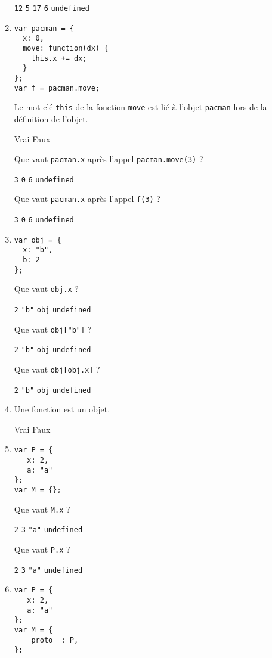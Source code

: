 \documentclass[a4paper, 12pt]{article}
\newcommand{\choice}[1]{\Square\hspace{2pt} #1\hspace{5pt}}
\newcommand{\choicec}[1]{\Square\hspace{2pt} \lstinline{#1}\hspace{5pt}}
\begin{document}
\begin{enumerate}
  \choicec{12} \choicec{5} \choicec{17} \choicec{6} \choicec{undefined}
\item \lstset{language=javascript}
\begin{lstlisting}
var pacman = {
  x: 0,
  move: function(dx) {
    this.x += dx;
  }
};
var f = pacman.move;
\end{lstlisting}

  Le mot-clé \lstinline{this} de la fonction \lstinline{move} est lié
  à l'objet \lstinline{pacman} lors de la définition de l'objet.

  \choice{Vrai} \choice{Faux}

  Que vaut \lstinline{pacman.x} après l'appel
  \lstinline{pacman.move(3)} ?

  \choicec{3} \choicec{0} \choicec{6} \choicec{undefined}

  Que vaut \lstinline{pacman.x} après l'appel \lstinline{f(3)} ?

  \choicec{3} \choicec{0} \choicec{6} \choicec{undefined}
\item \lstset{language=javascript}
\begin{lstlisting}
var obj = {
  x: "b",
  b: 2
};
\end{lstlisting}

  Que vaut \lstinline{obj.x} ?

  \choicec{2} \choicec{"b"} \choicec{obj} \choicec{undefined}

  Que vaut \lstinline{obj["b"]} ?

  \choicec{2} \choicec{"b"} \choicec{obj} \choicec{undefined}

  Que vaut \lstinline{obj[obj.x]} ?

  \choicec{2} \choicec{"b"} \choicec{obj} \choicec{undefined}
\item Une fonction est un objet.

   \choice{Vrai} \choice{Faux}
\item \lstset{language=javascript}
\begin{lstlisting}
var P = {
   x: 2,
   a: "a"
};
var M = {};
\end{lstlisting}

  Que vaut \lstinline{M.x} ?

  \choicec{2} \choicec{3} \choicec{"a"} \choicec{undefined}

  Que vaut \lstinline{P.x} ?

  \choicec{2} \choicec{3} \choicec{"a"} \choicec{undefined}
\item \lstset{language=javascript}
\begin{lstlisting}
var P = {
   x: 2,
   a: "a"
};
var M = {
  __proto__: P,
};
\end{lstlisting}


\end{enumerate}
\end{document}
